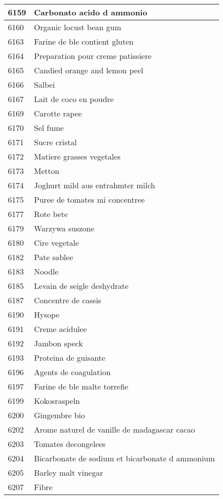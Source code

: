 \begin{longtable}{|l|l|}
6159 & Carbonato acido d ammonio \\ \hline 
6160 & Organic locust bean gum \\ \hline 
6163 & Farine de ble contient gluten \\ \hline 
6164 & Preparation pour creme patissiere \\ \hline 
6165 & Candied orange and lemon peel \\ \hline 
6166 & Salbei \\ \hline 
6167 & Lait de coco en poudre \\ \hline 
6169 & Carotte rapee \\ \hline 
6170 & Sel fume \\ \hline 
6171 & Sucre cristal \\ \hline 
6172 & Matiere grasses vegetales \\ \hline 
6173 & Metton \\ \hline 
6174 & Joghurt mild aus entrahmter milch \\ \hline 
6175 & Puree de tomates mi concentree \\ \hline 
6177 & Rote bete \\ \hline 
6179 & Warzywa suszone \\ \hline 
6180 & Cire vegetale \\ \hline 
6182 & Pate sablee \\ \hline 
6183 & Noodle \\ \hline 
6185 & Levain de seigle deshydrate \\ \hline 
6187 & Concentre de cassis \\ \hline 
6190 & Hysope \\ \hline 
6191 & Creme acidulee \\ \hline 
6192 & Jambon speck \\ \hline 
6193 & Proteina de guisante \\ \hline 
6196 & Agents de coagulation \\ \hline 
6197 & Farine de ble malte torrefie \\ \hline 
6199 & Kokosraspeln \\ \hline 
6200 & Gingembre bio \\ \hline 
6202 & Arome naturel de vanille de madagascar cacao \\ \hline 
6203 & Tomates decongelees \\ \hline 
6204 & Bicarbonate de sodium et bicarbonate d ammonium \\ \hline 
6205 & Barley malt vinegar \\ \hline 
6207 & Fibre \\ \hline 

\end{longtable}

